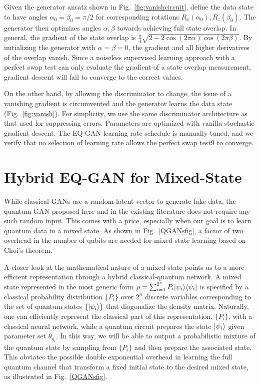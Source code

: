 \documentclass[prl,superscriptaddress,twocolumn]{revtex4}
\makeatletter
\newcommand{\sket}[1]{{\ensuremath{\lvert#1\rangle}}}
\newcommand{\lket}[1]{{\ensuremath{\left\lvert#1\right\rangle}}}
\newcommand{\ket}[1]{\if@display\lket{#1}\else\sket{#1}\fi}
\newcommand{\sbra}[1]{{\ensuremath{\langle#1\rvert}}}
\newcommand{\lbra}[1]{{\ensuremath{\left\langle#1\right\rvert}}}
\newcommand{\bra}[1]{\if@display\lbra{#1}\else\sbra{#1}\fi}
\theoremstyle{plain}
\theoremstyle{definition}
\makeatother
\begin{document}
Given the generator ansatz shown in Fig.~\ref{fig:vanishcircuit}, define the data state to have angles $\alpha_0 = \beta_0 = \pi/2$ for corresponding rotations $R_x(\alpha_0), R_z(\beta_0)$. The generator then optimizes angles $\alpha, \beta$ towards achieving full state overlap. In general, the gradient of the state overlap is $\frac{\pi}{4}\sqrt{2 - 2\cos(2 \pi \alpha)\cos(2\pi \beta)}$. By initializing the generator with $\alpha = \beta = 0$, the gradient and all higher derivatives of the overlap vanish. Since a noiseless supervised learning approach with a perfect swap test can only evaluate the gradient of a state overlap measurement, gradient descent will fail to converge to the correct values.

On the other hand, by allowing the discriminator to change, the issue of a vanishing gradient is circumvented and the generator learns the data state (Fig.~\ref{fig:vanish}). For simplicity, we use the same discriminator architecture as that used for suppressing errors. Parameters are optimized with vanilla stochastic gradient descent. The EQ-GAN learning rate schedule is manually tuned, and we verify that no selection of learning rate allows the perfect swap test9 to converge.

\section{Hybrid EQ-GAN for Mixed-State}
While classical GANs use a random latent vector to generate fake data, the quantum GAN proposed here and in the existing literature does not require any such random input. This comes with a price, especially when our goal is to learn quantum data in a mixed state. As shown in Fig.~\ref{QGANsfig}, a factor of two overhead in the number of qubits are needed for mixed-state learning based on  Choi's theorem.

A closer look at the mathematical nature of a mixed state points us to a more efficient representation through a hybrid classical-quantum network. A mixed state represented in the most generic form $\rho = \sum_{i=1}^{2^n} P_i \ket{\psi_i}\bra{\psi_i}$ is specified by a classical probability distribution $\{P_i\}$ over $2^n$ discrete variables corresponding to the set of quantum states $\{\ket{\psi_i}\}$ that diagonalize the density matrix. Naturally, one can efficiently represent the classical part of this representation, $\{P_i\}$, with a classical neural network, while a quantum circuit prepares the state $\ket{\psi_i}$ given parameter set $\theta_{g_i}$. In this way, we will be able to output a probabilistic mixture of the quantum state by sampling from $\{P_i\}$ and then prepare the associated state.
This obviates the possible double exponential overhead in learning the full quantum channel that transform a fixed initial state to the desired mixed state, as illustrated in Fig.~\ref{QGANsfig}.
\end{document}
